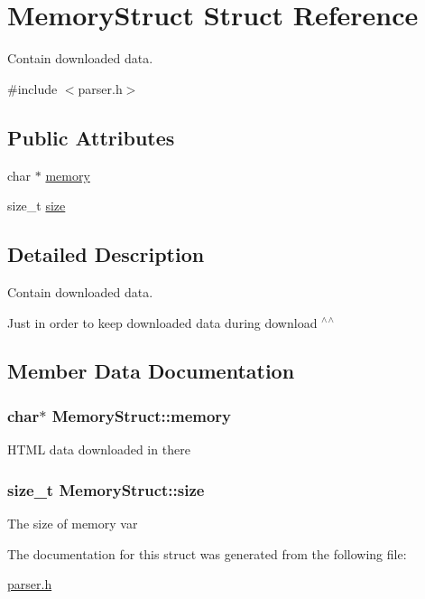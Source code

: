 \hypertarget{struct_memory_struct}{\section{Memory\+Struct Struct Reference}
\label{struct_memory_struct}
}


Contain downloaded data.  




{\ttfamily \#include $<$parser.\+h$>$}

\subsection*{Public Attributes}
\begin{DoxyCompactItemize}
\item 
char $\ast$ \hyperlink{struct_memory_struct_a218a6fde0f367d44400542cbe523e943}{memory}
\item 
size\+\_\+t \hyperlink{struct_memory_struct_a79d6a7ad34b172f766c19d0846688440}{size}
\end{DoxyCompactItemize}


\subsection{Detailed Description}
Contain downloaded data. 

Just in order to keep downloaded data during download $^\wedge$$^\wedge$ 

\subsection{Member Data Documentation}
\hypertarget{struct_memory_struct_a218a6fde0f367d44400542cbe523e943}{
\subsubsection[{memory}]{\setlength{\rightskip}{0pt plus 5cm}char$\ast$ Memory\+Struct\+::memory}}\label{struct_memory_struct_a218a6fde0f367d44400542cbe523e943}
H\+T\+M\+L data downloaded in there \hypertarget{struct_memory_struct_a79d6a7ad34b172f766c19d0846688440}{
\subsubsection[{size}]{\setlength{\rightskip}{0pt plus 5cm}size\+\_\+t Memory\+Struct\+::size}}\label{struct_memory_struct_a79d6a7ad34b172f766c19d0846688440}
The size of memory var 

The documentation for this struct was generated from the following file\+:\begin{DoxyCompactItemize}
\item 
\hyperlink{parser_8h}{parser.\+h}\end{DoxyCompactItemize}
